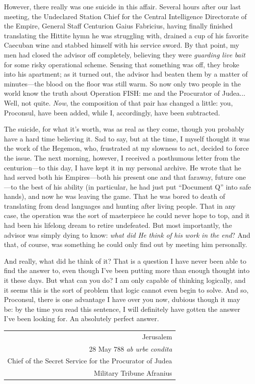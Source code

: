 However, there really was one suicide in this affair. Several hours after our last meeting, the Undeclared Station Chief for the Central Intelligence Directorate of the Empire, General Staff Centurion Gaius Fabricius, having finally finished translating the Hittite hymn he was struggling with, drained a cup of his favorite Caecuban wine and stabbed himself with his service sword. By that point, my men had closed the advisor off completely, believing they were \emph{guarding live bait} for some risky operational scheme. Sensing that something was off, they broke into his apartment; as it turned out, the advisor had beaten them by a matter of minutes---the blood on the floor was still warm. So now only two people in the world know the truth about Operation FISH: me and the Procurator of Judea... Well, not quite. \emph{Now}, the composition of that pair has changed a little: you, Proconsul, have been added, while I, accordingly, have been subtracted.

The suicide, for what it's worth, was as real as they come, though you probably have a hard time believing it. Sad to say, but at the time, I myself thought it was the work of the Hegemon, who, frustrated at my slowness to act, decided to force the issue. The next morning, however, I received a posthumous letter from the centurion---to this day, I have kept it in my personal archive. He wrote that he had served both his Empires---both his present one and that faraway, future one---to the best of his ability (in particular, he had just put ``Document Q'' into safe hands), and now he was leaving the game. That he was bored to death of translating from dead languages and hunting after living people. That in any case, the operation was the sort of masterpiece he could never hope to top, and it had been his lifelong dream to retire undefeated. But most importantly, the advisor was simply dying to know: \emph{what did He think of his work in the end}? And that, of course, was something he could only find out by meeting him personally.

And really, what did he think of it? That is a question I have never been able to find the answer to, even though I've been putting more than enough thought into it these days. But what can you do? I am only capable of thinking logically, and it seems this is the sort of problem that logic cannot even begin to solve. And so, Proconsul, there is one advantage I have over you now, dubious though it may be: by the time you read this sentence, I will definitely have gotten the answer I've been looking for. An absolutely perfect answer.

\hfill
\begin{tabular}{r@{}}
    Jerusalem \\
    28 May 788 \emph{ab urbe condita} \\
    Chief of the Secret Service for the Procurator of Judea \\
    Military Tribune Afranius
\end{tabular}



